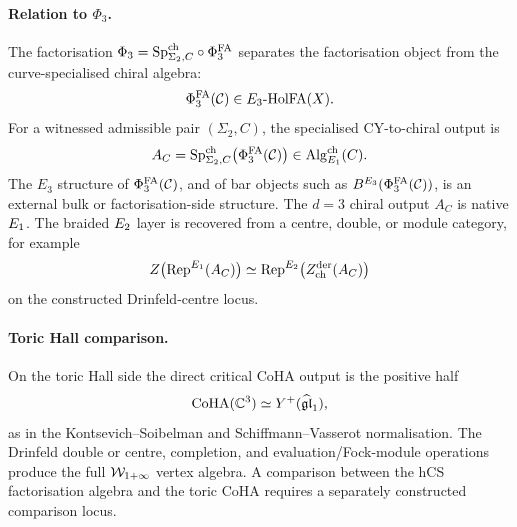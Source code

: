 \paragraph{Relation to \texorpdfstring{$\Phi_3$}{Phi3}.}
The factorisation \(\Phi_3=\mathrm{Sp}^{\mathrm{ch}}_{\Sigma_2,C}\circ\Phi^{\mathrm{FA}}_3\) separates
the factorisation object from the curve-specialised chiral algebra:
\[
  \Phi^{\mathrm{FA}}_3(\mathcal C)\in E_3\text{-}\mathrm{HolFA}(X).
\]
For a witnessed admissible pair \((\Sigma_2,C)\), the specialised
CY-to-chiral output is
\[
  A_C=
  \mathrm{Sp}^{\mathrm{ch}}_{\Sigma_2,C}\bigl(\Phi^{\mathrm{FA}}_3(\mathcal C)\bigr)
  \in \mathrm{Alg}^{\mathrm{ch}}_{E_1}(C).
\]
The \(E_3\) structure of \(\Phi^{\mathrm{FA}}_3(\mathcal C)\), and of bar objects
such as \(B^{E_3}(\Phi^{\mathrm{FA}}_3(\mathcal C))\), is an external bulk or
factorisation-side structure. The \(d = 3\) chiral output \(A_C\) is
native \(E_1\). The braided \(E_2\) layer is recovered from a
centre, double, or module category, for example
\[
  Z\bigl(\mathrm{Rep}^{E_1}(A_C)\bigr)
  \simeq
  \mathrm{Rep}^{E_2}\bigl(Z^{\mathrm{der}}_{\mathrm{ch}}(A_C)\bigr)
\]
on the constructed Drinfeld-centre locus.

\paragraph{Toric Hall comparison.}
On the toric Hall side the direct critical CoHA output is the positive
half
\[
  \mathrm{CoHA}(\mathbb{C}^3)\simeq Y^+(\widehat{\mathfrak{gl}}_1),
\]
as in the Kontsevich--Soibelman and Schiffmann--Vasserot normalisation.
The Drinfeld double or centre, completion, and evaluation/Fock-module
operations produce the full \(\mathcal{W}_{1+\infty}\) vertex algebra. A
comparison between the hCS factorisation algebra and the toric CoHA
requires a separately constructed comparison locus.

